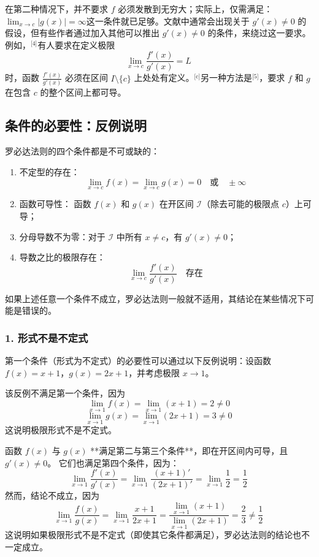 在第二种情况下，并不要求 $f$ 必须发散到无穷大；实际上，仅需满足：$\lim_{x \to c} |g(x)| = \infty$这一条件就已足够。文献中通常会出现关于 $g'(x) \ne 0$ 的假设，但有些作者通过加入其他可以推出 $g'(x) \ne 0$ 的条件，来绕过这一要求。例如，\(^\text{[4]}\)有人要求在定义极限
$$
\lim_{x \to c} \frac{f'(x)}{g'(x)} = L~
$$
时，函数 $\frac{f'(x)}{g'(x)}$ 必须在区间 $I \setminus \{c\}$ 上处处有定义。\(^\text{[c]}\)另一种方法是\(^\text{[5]}\)，要求 $f$ 和 $g$ 在包含 $c$ 的整个区间上都可导。
\subsection{条件的必要性：反例说明}
罗必达法则的四个条件都是不可或缺的：
\begin{enumerate}
\item 不定型的存在：
   $$
   \lim_{x \to c} f(x) = \lim_{x \to c} g(x) = 0 \quad \text{或} \quad \pm \infty~
   $$
\item 函数可导性：
   函数 $f(x)$ 和 $g(x)$ 在开区间 $\mathcal{I}$（除去可能的极限点 $c$）上可导；
\item 分母导数不为零：对于 $\mathcal{I}$ 中所有 $x \ne c$，有 $g'(x) \ne 0$；
\item 导数之比的极限存在：
   $$
   \lim_{x \to c} \frac{f'(x)}{g'(x)} \quad \text{存在}~
   $$
\end{enumerate}
如果上述任意一个条件不成立，罗必达法则一般就不适用，其结论在某些情况下可能是错误的。
\subsubsection{1. 形式不是不定式}
第一个条件（形式为不定式）的必要性可以通过以下反例说明：设函数$f(x) = x + 1$，$g(x) = 2x + 1$，并考虑极限 $x \to 1$。

该反例不满足第一个条件，因为
$$
\lim_{x \to 1} f(x) = \lim_{x \to 1} (x + 1) = 2 \neq 0~
$$
$$
\lim_{x \to 1} g(x) = \lim_{x \to 1} (2x + 1) = 3 \neq 0~
$$
这说明极限形式不是不定式。

函数 $f(x)$ 与 $g(x)$ **满足第二与第三个条件**，即在开区间内可导，且 $g'(x) \ne 0$。
它们也满足第四个条件，因为：
$$
\lim_{x \to 1} \frac{f'(x)}{g'(x)} = \lim_{x \to 1} \frac{(x + 1)'}{(2x + 1)'} =\lim_{x \to 1} \frac{1}{2} =\frac{1}{2}~
$$
然而，结论不成立，因为
$$
\lim_{x \to 1} \frac{f(x)}{g(x)} = \lim_{x \to 1} \frac{x + 1}{2x + 1} =\frac{\lim_{x \to 1}(x+1)}{\lim_{x \to 1}(2x+1)}= \frac{2}{3} \ne \frac{1}{2}~
$$
这说明如果极限形式不是不定式（即使其它条件都满足），罗必达法则的结论也不一定成立。
